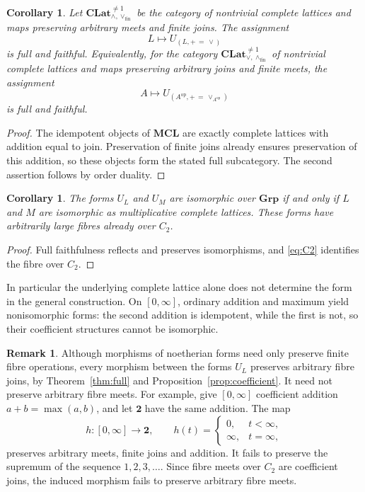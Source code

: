 \documentclass[12pt,a4paper]{amsart}
\newtheorem{corollary}[theorem]{Corollary}
\theoremstyle{definition}
\newtheorem{remark}[theorem]{Remark}
\newcommand{\Grp}{\mathbf{Grp}}
\newcommand{\op}{\mathrm{op}}
\newcommand{\two}{\mathbf{2}}
\newcommand{\MCL}{\mathbf{MCL}}
\newcommand{\CLm}{\mathbf{CLat}_{\wedge,\vee_{\mathrm{fin}}}^{\ne 1}}
\newcommand{\CLj}{\mathbf{CLat}_{\vee,\wedge_{\mathrm{fin}}}^{\ne 1}}
\begin{document}
\begin{corollary}\label{cor:latticeembedding}
Let $\CLm$ be the category of nontrivial complete lattices and maps preserving arbitrary meets and finite joins. The assignment
\[
                         L\longmapsto U_{(L,+\,=\,\vee)}
\]
is full and faithful. Equivalently, for the category $\CLj$ of nontrivial complete lattices and maps preserving arbitrary joins and finite meets, the assignment
\[
                         A\longmapsto U_{(A^{\op},+\,=\,\vee_{A^{\op}})}
\]
is full and faithful.
\end{corollary}
\begin{proof}
The idempotent objects of $\MCL$ are exactly complete lattices with addition equal to join. Preservation of finite joins already ensures preservation of this addition, so these objects form the stated full subcategory. The second assertion follows by order duality.
\end{proof}

\begin{corollary}\label{cor:range}
The forms $U_L$ and $U_M$ are isomorphic over $\Grp$ if and only if $L$ and $M$ are isomorphic as multiplicative complete lattices. These forms have arbitrarily large fibres already over $C_2$.
\end{corollary}
\begin{proof}
Full faithfulness reflects and preserves isomorphisms, and \eqref{eq:C2} identifies the fibre over $C_2$.
\end{proof}

In particular the underlying complete lattice alone does not determine the form in the general construction. On $[0,\infty]$, ordinary addition and maximum yield nonisomorphic forms: the second addition is idempotent, while the first is not, so their coefficient structures cannot be isomorphic.

\begin{remark}\label{rem:infinite}
Although morphisms of noetherian forms need only preserve finite fibre operations, every morphism between the forms $U_L$ preserves arbitrary fibre joins, by Theorem~\ref{thm:full} and Proposition~\ref{prop:coefficient}. It need not preserve arbitrary fibre meets.
For example, give $[0,\infty]$ coefficient addition $a+b=\max(a,b)$, and let $\two$ have the same addition. The map
\[
 h:[0,\infty]\longrightarrow\two,\qquad
 h(t)=
 \begin{cases}
 0,&t<\infty,\\
 \infty,&t=\infty,
 \end{cases}
\]
preserves arbitrary meets, finite joins and addition. It fails to preserve the supremum of the sequence $1,2,3,\ldots$. Since fibre meets over $C_2$ are coefficient joins, the induced morphism fails to preserve arbitrary fibre meets.
\end{remark}
\end{document}
